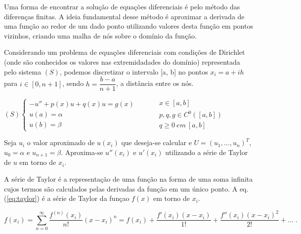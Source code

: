 \par Uma forma de encontrar a solução de equações diferenciais é pelo método das diferenças finitas. A ideia fundamental desse método é aproximar a derivada de uma função ao redor de um dado ponto utilizando valores desta função em pontos vizinhos, criando uma malha de nós sobre o domínio da função.
\par Considerando um problema de equações diferenciais com condições de Dirichlet (onde são conhecidos os valores nas extremidadades do domínio) representada pelo sistema $(S)$, podemos discretizar o intervalo [a, b] no pontos $x_i = a + ih$ para $i \in [0, n+1]$, sendo $h = \dfrac{b-a}{n+1}$, a distância entre os nós.

\begin{center}
	\begin{math}
		(S)
		\left\{
    		\begin{array}{l}
      			-u'' + p(x)u + q(x)u = g(x) \\
				u(a) = \alpha\\
				u(b) = \beta      			
    		\end{array}
    		\begin{array}{l}
      		\qquad \\
			\qquad \\
			\qquad	   
    		\end{array}
    		\begin{array}{l}
      			x \in [a, b] \\
				p, q, g \in C^0([a, b])\\
				q \geq 0 \ em \ [a, b]
    		\end{array}
		\right.
	\end{math}
\end{center} 

\par Seja $u_i$ o valor aproximado de $u(x_i)$ que deseja-se calcular e $U = (u_1, ..., u_n)^T$, $u_0 = \alpha$ e $u_{n+1} = \beta$. Aproxima-se $u''(x_i)$ e $u'(x_i)$ utilizando a série de Taylor de $u$ em torno de $x_i$.
\par A série de Taylor é a representação de uma função na forma de uma soma infinita cujos termos são calculados pelas derivadas da função em um único ponto.
A eq.(\ref{eq:taylor}) é a série de Taylor da funçao $f(x)$ em torno de $x_i$.

\begin{equation} \label{eq:taylor}
f(x_i) = \sum_{n=0}^\infty \dfrac{f^{(n)}(x_i)}{n!}(x-x_i)^n = f(x_i) + \dfrac{f'(x_i)(x-x_i)}{1!} + \dfrac{f''(x_i)(x-x_i)^2}{2!} + ... \;.
\end{equation}

